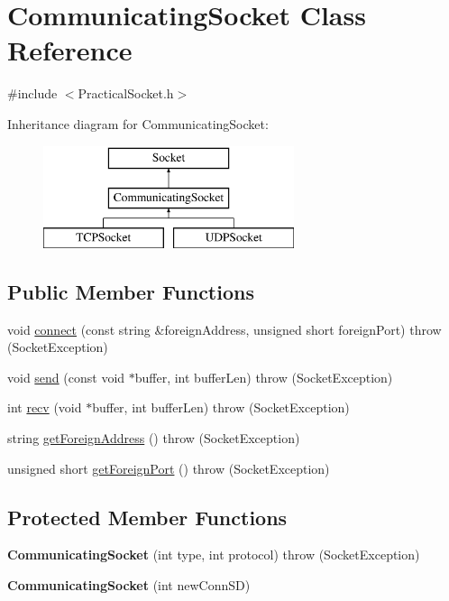 \hypertarget{classCommunicatingSocket}{\section{Communicating\-Socket Class Reference}
\label{classCommunicatingSocket}
}


{\ttfamily \#include $<$Practical\-Socket.\-h$>$}

Inheritance diagram for Communicating\-Socket\-:\begin{figure}[H]
\begin{center}
\leavevmode
\includegraphics[height=3.000000cm]{classCommunicatingSocket}
\end{center}
\end{figure}
\subsection*{Public Member Functions}
\begin{DoxyCompactItemize}
\item 
void \hyperlink{classCommunicatingSocket_a9192374d9baab8e189860aa8d913683c}{connect} (const string \&foreign\-Address, unsigned short foreign\-Port)  throw (\-Socket\-Exception)
\item 
void \hyperlink{classCommunicatingSocket_aca4e86085c064641e86ae24ea29bbb94}{send} (const void $\ast$buffer, int buffer\-Len)  throw (\-Socket\-Exception)
\item 
int \hyperlink{classCommunicatingSocket_a7cf1fd470c0060171b68df9f68c7bd01}{recv} (void $\ast$buffer, int buffer\-Len)  throw (\-Socket\-Exception)
\item 
string \hyperlink{classCommunicatingSocket_a13f9eca30ef56836cf23c163c848c09e}{get\-Foreign\-Address} ()  throw (\-Socket\-Exception)
\item 
unsigned short \hyperlink{classCommunicatingSocket_a184fbb4775184b87ebd886a5587eb1a3}{get\-Foreign\-Port} ()  throw (\-Socket\-Exception)
\end{DoxyCompactItemize}
\subsection*{Protected Member Functions}
\begin{DoxyCompactItemize}
\item 
\hypertarget{classCommunicatingSocket_a0017517b8d6e761fde0c40475af3b2ab}{{\bfseries Communicating\-Socket} (int type, int protocol)  throw (\-Socket\-Exception)}\label{classCommunicatingSocket_a0017517b8d6e761fde0c40475af3b2ab}

\item 
\hypertarget{classCommunicatingSocket_a27d758db782b3be7d28741e92cb613d1}{{\bfseries Communicating\-Socket} (int new\-Conn\-S\-D)}\label{classCommunicatingSocket_a27d758db782b3be7d28741e92cb613d1}

\end{DoxyCompactItemize}
